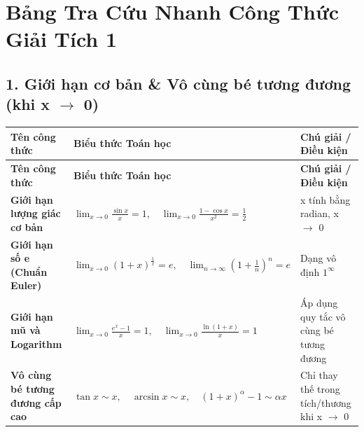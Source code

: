 \documentclass[11pt,a4paper,oneside]{book}
\begin{document}
\chapter*{Bảng Tra Cứu Nhanh Công Thức Giải Tích 1}

\section*{1. Giới hạn cơ bản \& Vô cùng bé tương đương (khi x $\to$  0)}
\begin{longtable}{|p{}|p{}|p{}|}
\hline
\rowcolor{blue!10} \textbf{Tên công thức} & \textbf{Biểu thức Toán học} & \textbf{Chú giải / Điều kiện} \\ \hline
\endfirsthead
\hline
\rowcolor{blue!10} \textbf{Tên công thức} & \textbf{Biểu thức Toán học} & \textbf{Chú giải / Điều kiện} \\ \hline
\endhead
\textbf{Giới hạn lượng giác cơ bản} & $\displaystyle \lim_{x \to 0} \frac{\sin x}{x} = 1, \quad \lim_{x \to 0} \frac{1 - \cos x}{x^2} = \frac{1}{2}$ & x tính bằng radian, x $\to$ 0 \\ \hline
\textbf{Giới hạn số e (Chuẩn Euler)} & $\displaystyle \lim_{x \to 0} (1 + x)^{\frac{1}{x}} = e, \quad \lim_{n \to \infty} \left(1 + \frac{1}{n}\right)^n = e$ & Dạng vô định $1^\infty$ \\ \hline
\textbf{Giới hạn mũ và Logarithm} & $\displaystyle \lim_{x \to 0} \frac{e^x - 1}{x} = 1, \quad \lim_{x \to 0} \frac{\ln(1 + x)}{x} = 1$ & Áp dụng quy tắc vô cùng bé tương đương \\ \hline
\textbf{Vô cùng bé tương đương cấp cao} & $\displaystyle \tan x \sim x, \quad \arcsin x \sim x, \quad (1+x)^\alpha - 1 \sim \alpha x$ & Chỉ thay thế trong tích/thương khi x $\to$ 0 \\ \hline
\end{longtable}
\end{document}
